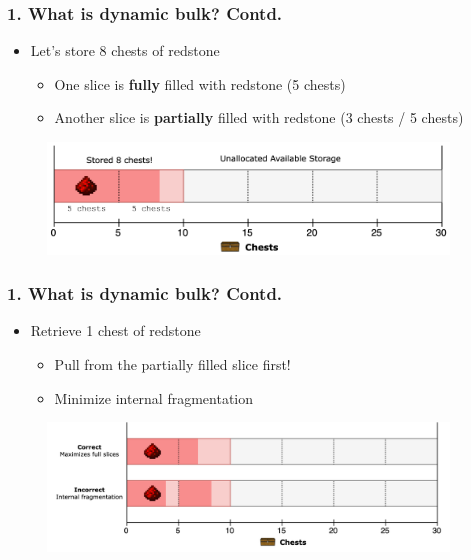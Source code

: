 \documentclass[aspectratio=169]{beamer}
\begin{document}
\begin{frame}
	\frametitle{1. What is dynamic bulk? Contd.}

    \begin{itemize}
		\item Let's store 8 chests of redstone
        \begin{itemize}
        \item One slice is \textbf{fully} filled with redstone (5 chests)
        \item Another slice is \textbf{partially} filled with redstone (3 chests / 5 chests)
        \end{itemize}
	\end{itemize}

    \begin{figure}
        \includegraphics[width=0.95\textwidth]{logic3.png}
	\end{figure}
\end{frame}

\begin{frame}
	\frametitle{1. What is dynamic bulk? Contd.}

    \begin{itemize}
		\item Retrieve 1 chest of redstone
        \begin{itemize}
        \item Pull from the partially filled slice first!
        \item Minimize internal fragmentation
        \end{itemize}
	\end{itemize}

    \begin{figure}
        \includegraphics[width=0.95\textwidth]{logic4.png}
	\end{figure}
\end{frame}
\end{document}
